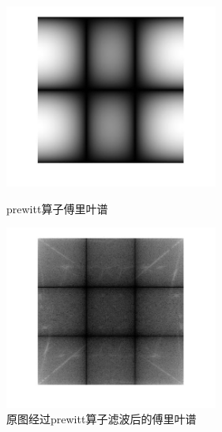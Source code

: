 \documentclass[11pt, a4paper, UTF8]{ctexart}
\begin{document}
  \begin{figure}[H]
    \centering
    \begin{minipage}[t]{0.48\textwidth}
    \centering
    \includegraphics[width=7cm]{prewitt.jpg}
    \caption{prewitt算子傅里叶谱}
    \end{minipage}
    \begin{minipage}[t]{0.48\textwidth}
    \centering
    \includegraphics[width=7cm]{average_filter.jpg}
    \caption{原图经过prewitt算子滤波后的傅里叶谱}
    \end{minipage}
  \end{figure}
\end{document}
